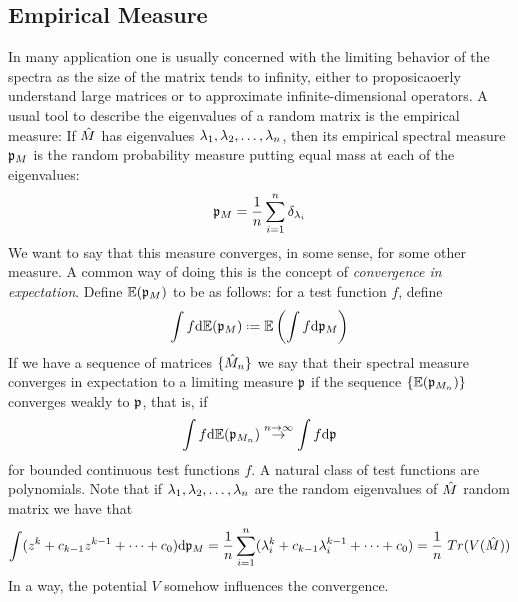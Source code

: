 \subsection{Empirical Measure}


In many application one is usually concerned with the limiting behavior of the spectra as the size of the matrix tends to infinity, either to proposicaoerly understand large matrices or to approximate infinite-dimensional operators. A usual tool to describe the eigenvalues of a random matrix is the empirical measure: If $\hat M$ has eigenvalues $\lambda_1, \lambda_2, \dots, \lambda_n$, then its empirical spectral measure $\mathfrak{p}_M$ is the random probability measure putting equal mass at each of the eigenvalues:
\begin{equation}
	\mathfrak{p}_M = \frac{1}{n} \sum_{i=1}^n \delta_{\lambda_i}
\end{equation}
We want to say that this measure converges, in some sense, for some other measure. A common way of doing this is the concept of \textit{convergence in expectation}. Define $\mathbb{E}(\mathfrak{p}_M)$ to be as follows: for a test function $f$, define
\begin{equation}
	\int f \dd \E(\pe_M) \deff \E \left(\int f \dd \pe_M \right) 
\end{equation}
If we have a sequence of matrices $\{\hat M_n\}$ we say that their spectral measure converges in expectation to a limiting measure $\mathfrak{p}$ if the sequence $\{\mathbb{E}(\mathfrak{p}_{M_n})\}$ converges weakly to $\mathfrak{p}$, that is, if
\begin{equation}
	\int f \mathrm{d} \mathbb{E}(\mathfrak{p}_{M_n}) \stackrel{n \rightarrow \infty}{\rightarrow} \int f \mathrm{d} \mathfrak{p} 
\end{equation} 
for bounded continuous test functions $f$. A natural class of test functions are polynomials. Note that if $\lambda_1, \lambda_2, \dots, \lambda_n$ are the random eigenvalues of $\hat M$ random matrix we have that
\begin{equation}
	\int (z^k + c_{k-1} z^{k-1} + \cdots + c_{0}) \dd \pe_{M} = \frac{1}{n} \sum_{i=1}^n (\lambda_i^k + c_{k-1} \lambda_i^{k-1} + \cdots + c_{0}) = \frac{1}{n} \ Tr(V(\m{M}))
\end{equation}
In a way, the potential $V$ somehow influences the convergence.
